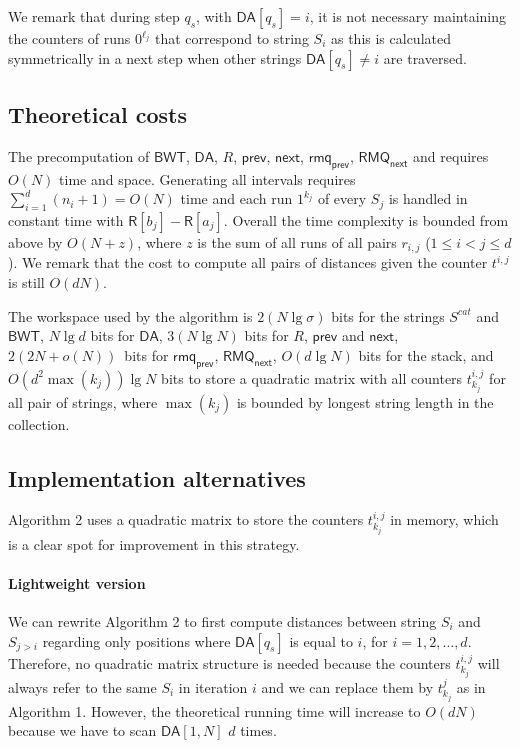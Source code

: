 \documentclass{elsarticle}
\newcommand{\DA}{\ensuremath{\mathsf{DA}}\xspace}
\newcommand{\BWT}{\ensuremath{\mathsf{BWT}}\xspace}
\newcommand{\R}{\ensuremath{\mathsf{R}}\xspace}
\newcommand{\RMQ}{\ensuremath{\mathsf{RMQ}}\xspace}
\newcommand{\rmq}{\ensuremath{\mathsf{rmq}}\xspace}
\newcommand{\Prev}{\ensuremath{\mathsf{prev}}\xspace}
\newcommand{\Next}{\ensuremath{\mathsf{next}}\xspace}
\begin{document}
We remark that during step $q_s$, with $\DA[q_s]=i$, it is not necessary
maintaining the counters of runs $0^{\ell_j}$ that correspond to string
$S_i$ as this is calculated symmetrically in a next step when other strings
$\DA[q_s]\not=i$ are traversed.

\subsection{Theoretical costs}
The precomputation of \BWT, \DA, $R$, \Prev, \Next, $\rmq_{\Prev}$, $\RMQ_{\Next}$ and
requires $O(N)$ time and space.
Generating all intervals requires $\sum_{i=1}^d(n_i+1)=O(N)$ time and each run $1^{k_j}$
of every $S_j$ is handled in constant time with $\R[b_j]-\R[a_j]$.
Overall the time complexity is bounded from above by $O(N+z)$,
where $z$ is the sum of all runs of all pairs $r_{i,j}$ ($1\leq i<j\leq d$).
We remark that the cost to compute all pairs of distances given the counter
$t^{i,j}$ is still $O(dN)$.

The workspace used by the algorithm is $2(N\lg\sigma)$ bits for the
strings $S^{cat}$ and \BWT,
$N\lg d$ bits for \DA,
$3 (N\lg N)$ bits for $R$, \Prev and \Next,
$2 (2N+o(N))$~bits for $\rmq_{\Prev}$, $\RMQ_{\Next}$,
$O(d \lg N)$ bits for the stack,
and
$O(d^2 \max(k_j)) \lg N$ bits to store a quadratic matrix with all
counters $t^{i,j}_{k_j}$ for all pair of strings, where $\max(k_j)$ is bounded by
longest string length in the collection.

\subsection{Implementation alternatives}\label{s:alternatives2}

Algorithm 2 uses a quadratic matrix to store the counters $t^{i,j}_{k_j}$ in
memory, which is a clear spot for improvement in this strategy.

\paragraph{Lightweight version}
We can rewrite Algorithm 2 to first compute distances between string $S_i$ and
 $S_{j>i}$ regarding only positions where $\DA[q_s]$ is equal to $i$, for
$i=1,2,\dots,d$.
Therefore, no quadratic matrix structure is
needed because the counters $t^{i,j}_{k_j}$ will always refer to the same $S_i$
in iteration $i$ and we can replace them by $t^{j}_{k_j}$ as in
Algorithm 1.
However, the theoretical running time will increase to $O(dN)$ because we have
to scan $\DA[1,N]$ $d$ times.
\end{document}
